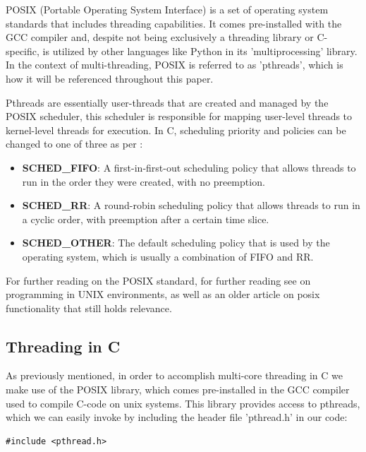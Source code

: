 \documentclass[12pt,a4paper]{article}
\begin{document}
POSIX (Portable Operating System Interface)\parencite{GNUPOSIX,POSIXDocs} is a set of operating system standards that includes threading capabilities. It comes pre-installed with the GCC compiler\parencite{GNUPOSIX} and, despite not being exclusively a threading library or C-specific, is utilized by other languages like Python in its 'multiprocessing' library. In the context of multi-threading, POSIX is referred to as 'pthreads', which is how it will be referenced throughout this paper.

Pthreads are essentially user-threads that are created and managed by the POSIX scheduler, this scheduler is responsible for mapping user-level threads to kernel-level threads for execution. In C, scheduling priority and policies can be changed to one of three as per \cite[pp. 359-360]{Rauber2023}:

\begin{itemize}
    \item \textbf{SCHED\_FIFO}: A first-in-first-out scheduling policy that allows threads to run in the order they were created, with no preemption.
    \item \textbf{SCHED\_RR}: A round-robin scheduling policy that allows threads to run in a cyclic order, with preemption after a certain time slice.
    \item \textbf{SCHED\_OTHER}: The default scheduling policy that is used by the operating system, which is usually a combination of FIFO and RR.
\end{itemize}

For further reading on the POSIX standard, for further reading see  on programming in UNIX environments, as well as  an older article on posix functionality that still holds relevance.

\subsection{Threading in C}

As previously mentioned, in order to accomplish multi-core threading in C we make use of the POSIX library, which comes pre-installed in the GCC compiler used to compile C-code on unix systems. This library provides access to pthreads, which we can easily invoke by including the header file 'pthread.h' in our code:

\begin{verbatim}
#include <pthread.h>
\end{verbatim}
\end{document}
